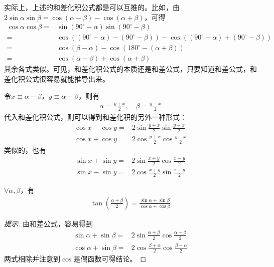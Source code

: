 \begin{example}[和差化积公式互推]
  实际上，上述的和差化积公式都是可以互推的。比如，由$2\sin\alpha\sin\beta = \cos(\alpha-\beta) - \cos(\alpha+\beta)$，可得
  \begin{align*}
    \cos\alpha\cos\beta ={} & \sin(90^\circ - \alpha)\sin(90^\circ - \beta) \\
                        ={} & \cos\left( (90^\circ - \alpha) - (90^\circ - \beta) \right) - 
                              \cos\left( (90^\circ - \alpha) + (90^\circ - \beta) \right)\\
                        ={} & \cos(\beta - \alpha) - \cos\left( 180^\circ - (\alpha + \beta) \right) \\
                        ={} & \cos(\alpha - \beta) + \cos(\alpha + \beta)
  \end{align*}
  其余各式类似。可见，和差化积公式的本质还是和差公式，只要知道和差公式，和差化积公式很容易就能推导出来。
\end{example}

\begin{example}
  令$x \equiv \alpha - \beta$，$y\equiv \alpha + \beta$，则有
  \begin{align*}
    \alpha = \frac{y+x}{2},\quad \beta = \frac{y-x}{2}
  \end{align*}
  代入和差化积公式，则可以得到和差化积的另外一种形式：
  \begin{align*}
    \cos x - \cos y ={}& 2 \sin\frac{y+x}{2} \sin\frac{y-x}{2}\\[5pt]
    \cos x + \cos y ={}& 2 \cos\frac{y+x}{2} \cos\frac{y-x}{2}
  \end{align*}
  类似的，也有
  \begin{align*}
    \sin x + \sin y ={}& 2 \sin\frac{x+y}{2}\cos\frac{x-y}{2}\\[5pt]
    \sin x - \sin y ={}& 2 \cos\frac{x+y}{2}\sin\frac{x-y}{2}
  \end{align*}
\end{example}

\begin{example}
  $\forall \alpha, \beta$，有
  \begin{align*}
    \tan\left(\frac{\alpha + \beta}{2}\right) = \frac{\sin\alpha + \sin\beta}{\cos\alpha + \cos\beta}
  \end{align*}
\end{example}
\begin{proof}[提示]
  由和差公式，容易得到
  \begin{align*}
    \sin\alpha + \sin\beta ={}& 2 \sin\frac{\alpha+\beta}2 \cos\frac{\alpha-\beta}2 \\[3pt]
    \cos\alpha + \sin\beta ={}& 2 \cos\frac{\beta+\alpha}2 \cos\frac{\beta-\alpha}2
  \end{align*}
  两式相除并注意到$\cos$是偶函数可得结论。
\end{proof}

